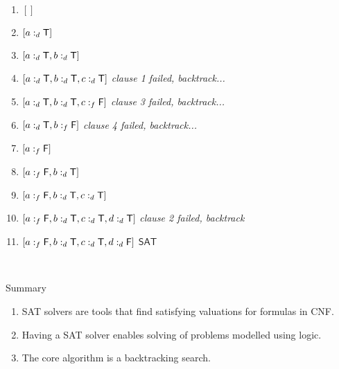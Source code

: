 \documentclass[xetex,aspectratio=169,14pt,hyperref={pdfpagelabels=true,pdflang={en-GB}}]{beamer}
\begin{document}
\begin{frame}[t]
{\footnotesize
  \begin{enumerate}
  \item $[]$
    \vspace{-0.5em}
  \item<2-> $[a :_d \mathsf{T}]$
    \vspace{-0.5em}
  \item<3-> $[a :_d \mathsf{T}, b :_d \mathsf{T}]$
    \vspace{-0.5em}
  \item<4-> $[a :_d \mathsf{T}, b :_d \mathsf{T}, c :_d \mathsf{T}]$ \qquad \emph{clause 1 failed, backtrack...}
    \vspace{-0.5em}
  \item<5-> $[a :_d \mathsf{T}, b :_d \mathsf{T}, c :_f \mathsf{F}]$ \qquad \emph{clause 3 failed, backtrack...}
    \vspace{-0.5em}
  \item<6-> $[a :_d \mathsf{T}, b :_f \mathsf{F}]$ \qquad \emph{clause 4 failed, backtrack...}
    \vspace{-0.5em}
  \item<7-> $[a :_f \mathsf{F}]$
    \vspace{-0.5em}
  \item<8-> $[a :_f \mathsf{F}, b :_d \mathsf{T}]$
    \vspace{-0.5em}
  \item<9-> $[a :_f \mathsf{F}, b :_d \mathsf{T}, c :_d \mathsf{T}]$
    \vspace{-0.5em}
  \item<10-> $[a :_f \mathsf{F}, b :_d \mathsf{T}, c :_d \mathsf{T}, d :_d \mathsf{T}]$ \qquad \emph{clause 2 failed, backtrack}
    \vspace{-0.5em}
  \item<11-> $[a :_f \mathsf{F}, b :_d \mathsf{T}, c :_d \mathsf{T}, d :_d \mathsf{F}]$ \qquad $\mathsf{SAT}$
  \end{enumerate}
  ~}
\end{frame}

\begin{frame}
  {Summary}

  \begin{enumerate}
  \item SAT solvers are tools that find satisfying valuations for formulas in CNF.
  \item Having a SAT solver enables solving of problems modelled using logic.
  \item The core algorithm is a backtracking search.
  \end{enumerate}
\end{frame}
\end{document}
